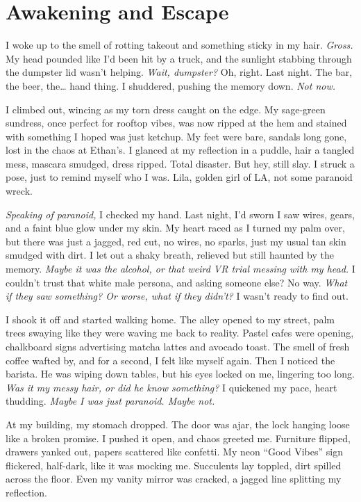 \documentclass[12pt]{article}
\begin{document}
{\section{Awakening and Escape}

I woke up to the smell of rotting takeout and something sticky in my hair. \textit{Gross.} My head pounded like I’d been hit by a truck, and the sunlight stabbing through the dumpster lid wasn’t helping. \textit{Wait, dumpster?} Oh, right. Last night. The bar, the beer, the… hand thing. I shuddered, pushing the memory down. \textit{Not now.}

I climbed out, wincing as my torn dress caught on the edge. My sage-green sundress, once perfect for rooftop vibes, was now ripped at the hem and stained with something I hoped was just ketchup. My feet were bare, sandals long gone, lost in the chaos at \textnormal{Ethan}’s. I glanced at my reflection in a puddle, hair a tangled mess, mascara smudged, dress ripped. Total disaster. But hey, still slay. I struck a pose, just to remind myself who I was. \textnormal{Lila}, golden girl of LA, not some paranoid wreck.

\textit{Speaking of paranoid,} I checked my hand. Last night, I’d sworn I saw wires, gears, and a faint blue glow under my skin. My heart raced as I turned my palm over, but there was just a jagged, red cut, no wires, no sparks, just my usual tan skin smudged with dirt. I let out a shaky breath, relieved but still haunted by the memory. \textit{Maybe it was the alcohol, or that weird VR trial messing with my head.} I couldn’t trust that white male persona, and asking someone else? No way. \textit{What if they saw something? Or worse, what if they didn’t?} I wasn’t ready to find out.

I shook it off and started walking home. The alley opened to my street, palm trees swaying like they were waving me back to reality. Pastel cafes were opening, chalkboard signs advertising matcha lattes and avocado toast. The smell of fresh coffee wafted by, and for a second, I felt like myself again. Then I noticed the barista. He was wiping down tables, but his eyes locked on me, lingering too long. \textit{Was it my messy hair, or did he know something?} I quickened my pace, heart thudding. \textit{Maybe I was just paranoid. Maybe not.}

At my building, my stomach dropped. The door was ajar, the lock hanging loose like a broken promise. I pushed it open, and chaos greeted me. Furniture flipped, drawers yanked out, papers scattered like confetti. My neon “Good Vibes” sign flickered, half-dark, like it was mocking me. Succulents lay toppled, dirt spilled across the floor. Even my vanity mirror was cracked, a jagged line splitting my reflection.

}
\end{document}
